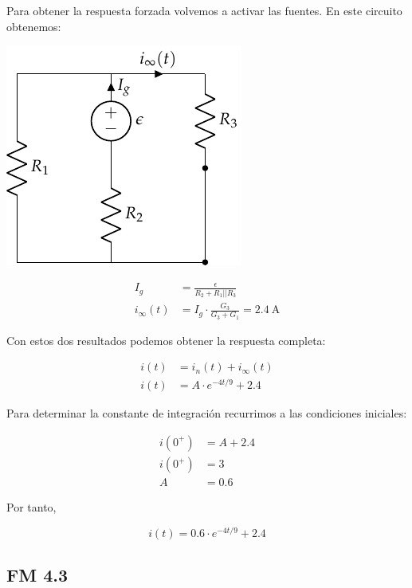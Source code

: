 \documentclass[12pt]{article}
\begin{document}
Para obtener la respuesta forzada volvemos a activar las fuentes. En este circuito obtenemos:

\begin{minipage}{0.3\textwidth}
\includegraphics{figs/FM_4_2_forzada}
\end{minipage}
\begin{minipage}{0.7\textwidth}
  \begin{align*}
    I_g &= \frac{\epsilon}{R_2 + R_1||R_3}\\
    i_\infty(t) &= I_g \cdot \frac{G_3}{G_3 + G_1} = \SI{2.4}{\ampere}
  \end{align*}
\end{minipage}

Con estos dos resultados podemos obtener la respuesta completa:

\begin{align*}
  i(t) &= i_n(t) + i_\infty(t)\\
  i(t) &= A \cdot e^{-4t/9} + 2.4
\end{align*}

Para determinar la constante de integración recurrimos a las condiciones iniciales:

\begin{align*}
  i(0^+) &= A + 2.4\\
  i(0^+) &= 3\\
  A &= 0.6
\end{align*}

Por tanto,

\begin{equation*}
  i(t) = 0.6 \cdot e^{-4t/9} + 2.4
\end{equation*}

\clearpage

\subsection{FM 4.3}
\end{document}
